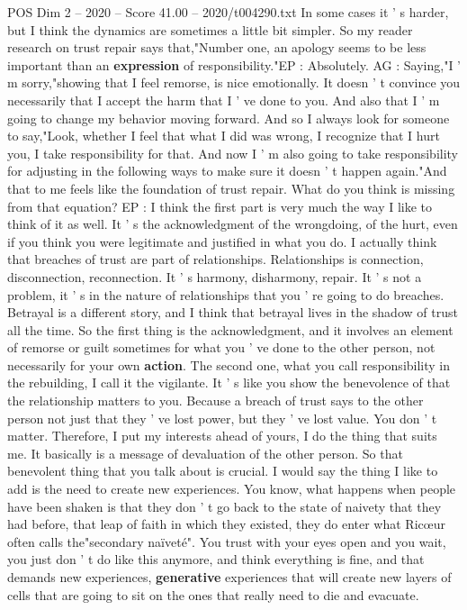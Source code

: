 \begin{textsample}{POS Dim 2 – 2020 – Score 41.00 – 2020/t004290.txt}
In some cases it ' s harder, but I think the dynamics are sometimes a little bit simpler.
So my reader research on trust repair says that,"Number one, an apology seems to be less important than an \textbf{expression} of responsibility."EP : Absolutely.
AG : Saying,"I ' m sorry,"showing that I feel remorse, is nice emotionally.
It doesn ' t convince you necessarily that I accept the harm that I ' ve done to you.
And also that I ' m going to change my behavior moving forward.
And so I always look for someone to say,"Look, whether I feel that what I did was wrong, I recognize that I hurt you, I take responsibility for that.
And now I ' m also going to take responsibility for adjusting in the following ways to make sure it doesn ' t happen again."And that to me feels like the foundation of trust repair.
What do you think is missing from that equation?
EP : I think the first part is very much the way I like to think of it as well.
It ' s the acknowledgment of the wrongdoing, of the hurt, even if you think you were legitimate and justified in what you do.
I actually think that breaches of trust are part of relationships.
Relationships is connection, disconnection, reconnection.
It ' s harmony, disharmony, repair.
It ' s not a problem, it ' s in the nature of relationships that you ' re going to do breaches.
Betrayal is a different story, and I think that betrayal lives in the shadow of trust all the time.
So the first thing is the acknowledgment, and it involves an element of remorse or guilt sometimes for what you ' ve done to the other person, not necessarily for your own \textbf{action}.
The second one, what you call responsibility in the rebuilding, I call it the vigilante.
It ' s like you show the benevolence of that the relationship matters to you.
Because a breach of trust says to the other person not just that they ' ve lost power, but they ' ve lost value.
You don ' t matter.
Therefore, I put my interests ahead of yours, I do the thing that suits me.
It basically is a message of devaluation of the other person.
So that benevolent thing that you talk about is crucial.
I would say the thing I like to add is the need to create new experiences.
You know, what happens when people have been shaken is that they don ' t go back to the state of naivety that they had before, that leap of faith in which they existed, they do enter what Ricœur often calls the"secondary naïveté".
You trust with your eyes open and you wait, you just don ' t do like this anymore, and think everything is fine, and that demands new experiences, \textbf{generative} experiences that will create new layers of cells that are going to sit on the ones that really need to die and evacuate.

\end{textsample}
